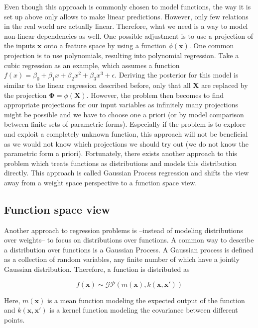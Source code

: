 \documentclass[authoryear,11pt,review]{elsarticle}
\begin{document}
Even though this approach is commonly chosen to model functions, the way it is set up above only allows to make linear predictions. However, only few relations in the real world are actually linear. Therefore, what we need is a way to model non-linear dependencies as well. One possible adjustment is to use a projection of the inputs $\mathbf{x}$ onto a feature space by using a function $\phi(\mathbf{x})$. One common projection is to use polynomials, resulting into polynomial regression. Take a cubic regression as an example, which assumes a function $f(x)=\beta_0+\beta_1x+\beta_2x^2+\beta_3x^3+\epsilon$. Deriving the posterior for this model is similar to the linear regression described before, only that all  $\mathbf{X}$ are replaced by the projection $\mathbf{\Phi}=\phi(\mathbf{X})$. However, the problem then becomes to find appropriate projections for our input variables as infinitely many projections might be possible and we have to choose one a priori (or by model comparison between finite sets of parametric forms). Especially if the problem is to explore and exploit a completely unknown function, this approach will not be beneficial as we would not know which projections we should try out (we do not know the parametric form a priori). Fortunately, there exists another approach to this problem which treats functions as distributions and models this distribution directly. This approach is called Gaussian Process regression and shifts the view away from a weight space perspective to a function space view.


\subsection{Function space view}
Another approach to regression problems is --instead of modeling distributions over weights-- to focus on distributions over functions. A common way to describe a distribution over functions is a Gaussian Process. A Gaussian process is defined as a collection of random variables, any finite number of which have a jointly Gaussian distribution. Therefore, a function is distributed as

\begin{equation*}
f(\mathbf{x}) \sim \mathcal{GP}(m(\mathbf{x}),k(\mathbf{x},  \mathbf{x}'))
\end{equation*}

Here, $m(\mathbf{x})$ is a mean function modeling the expected output of the function and $k( \mathbf{x}, \mathbf{x}')$ is a kernel function modeling the covariance between different points. 
\end{document}
